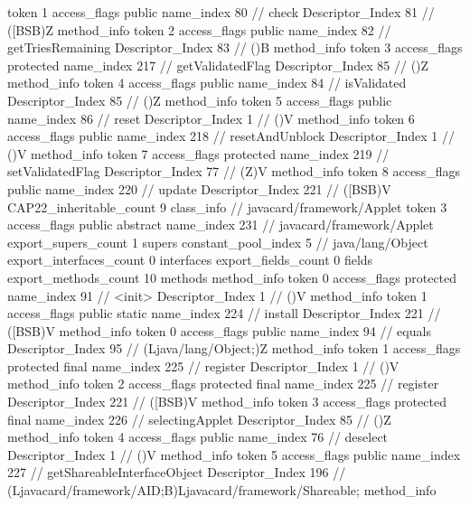 {{{{{					token	1
					access_flags	public
					name_index	80		// check
					Descriptor_Index	81		// ([BSB)Z
				}
				method_info {
					token	2
					access_flags	public
					name_index	82		// getTriesRemaining
					Descriptor_Index	83		// ()B
				}
				method_info {
					token	3
					access_flags	protected
					name_index	217		// getValidatedFlag
					Descriptor_Index	85		// ()Z
				}
				method_info {
					token	4
					access_flags	public
					name_index	84		// isValidated
					Descriptor_Index	85		// ()Z
				}
				method_info {
					token	5
					access_flags	public
					name_index	86		// reset
					Descriptor_Index	1		// ()V
				}
				method_info {
					token	6
					access_flags	public
					name_index	218		// resetAndUnblock
					Descriptor_Index	1		// ()V
				}
				method_info {
					token	7
					access_flags	protected
					name_index	219		// setValidatedFlag
					Descriptor_Index	77		// (Z)V
				}
				method_info {
					token	8
					access_flags	public
					name_index	220		// update
					Descriptor_Index	221		// ([BSB)V
				}
			}
			CAP22_inheritable_count	9
		}
		class_info {		// javacard/framework/Applet
			token	3
			access_flags	public abstract
			name_index	231		// javacard/framework/Applet
			export_supers_count	1
			supers {
				constant_pool_index	5		// java/lang/Object
			}
			export_interfaces_count	0
			interfaces {
			}
			export_fields_count	0
			fields {
			}
			export_methods_count	10
			methods {
				method_info {
					token	0
					access_flags	protected
					name_index	91		// <init>
					Descriptor_Index	1		// ()V
				}
				method_info {
					token	1
					access_flags	public static
					name_index	224		// install
					Descriptor_Index	221		// ([BSB)V
				}
				method_info {
					token	0
					access_flags	public
					name_index	94		// equals
					Descriptor_Index	95		// (Ljava/lang/Object;)Z
				}
				method_info {
					token	1
					access_flags	protected final
					name_index	225		// register
					Descriptor_Index	1		// ()V
				}
				method_info {
					token	2
					access_flags	protected final
					name_index	225		// register
					Descriptor_Index	221		// ([BSB)V
				}
				method_info {
					token	3
					access_flags	protected final
					name_index	226		// selectingApplet
					Descriptor_Index	85		// ()Z
				}
				method_info {
					token	4
					access_flags	public
					name_index	76		// deselect
					Descriptor_Index	1		// ()V
				}
				method_info {
					token	5
					access_flags	public
					name_index	227		// getShareableInterfaceObject
					Descriptor_Index	196		// (Ljavacard/framework/AID;B)Ljavacard/framework/Shareable;
				}
				method_info {
}}}}}
